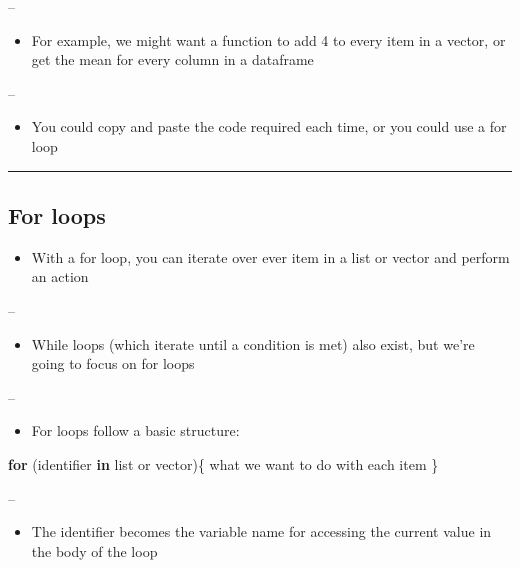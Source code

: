 \documentclass[]{article}
\newenvironment{Shaded}{\begin{snugshade}}{\end{snugshade}}
\newcommand{\ControlFlowTok}[1]{\textcolor[rgb]{0.13,0.29,0.53}{\textbf{#1}}}
\newcommand{\NormalTok}[1]{#1}
\providecommand{\tightlist}{%
  \setlength{\itemsep}{0pt}\setlength{\parskip}{0pt}}
\begin{document}
--

\begin{itemize}
\tightlist
\item
  For example, we might want a function to add 4 to every item in a
  vector, or get the mean for every column in a dataframe
\end{itemize}

--

\begin{itemize}
\tightlist
\item
  You could copy and paste the code required each time, or you could use
  a for loop
\end{itemize}

\begin{center}\rule{0.5\linewidth}{\linethickness}\end{center}

\hypertarget{for-loops-1}{%
\subsection{For loops}\label{for-loops-1}}

\begin{itemize}
\tightlist
\item
  With a for loop, you can iterate over ever item in a list or vector
  and perform an action
\end{itemize}

--

\begin{itemize}
\tightlist
\item
  While loops (which iterate until a condition is met) also exist, but
  we're going to focus on for loops
\end{itemize}

--

\begin{itemize}
\tightlist
\item
  For loops follow a basic structure:
\end{itemize}

\begin{Shaded}
\begin{Highlighting}[]
\ControlFlowTok{for}\NormalTok{ (identifier }\ControlFlowTok{in}\NormalTok{ list or vector)\{}
\NormalTok{  what we want to do with each item}
\NormalTok{\}}
\end{Highlighting}
\end{Shaded}

--

\begin{itemize}
\tightlist
\item
  The identifier becomes the variable name for accessing the current
  value in the body of the loop
\end{itemize}
\end{document}
